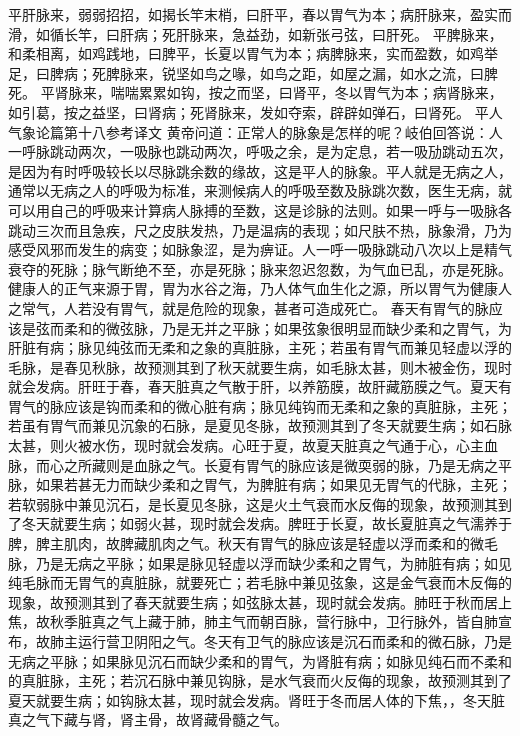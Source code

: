 \documentclass[a4paper,12pt,UTF8,twoside]{ctexbook}
\begin{document}
平肝脉来，弱弱招招，如揭长竿末梢，曰肝平，春以胃气为本；病肝脉来，盈实而滑，如循长竿，曰肝病；死肝脉来，急益劲，如新张弓弦，曰肝死。
平脾脉来，和柔相离，如鸡践地，曰脾平，长夏以胃气为本；病脾脉来，实而盈数，如鸡举足，曰脾病；死脾脉来，锐坚如鸟之喙，如鸟之距，如屋之漏，如水之流，曰脾死。
平肾脉来，喘喘累累如钩，按之而坚，曰肾平，冬以胃气为本；病肾脉来，如引葛，按之益坚，曰肾病；死肾脉来，发如夺索，辟辟如弹石，曰肾死。
平人气象论篇第十八参考译文
黄帝问道：正常人的脉象是怎样的呢？岐伯回答说：人一呼脉跳动两次，一吸脉也跳动两次，呼吸之余，是为定息，若一吸劢跳动五次，是因为有时呼吸较长以尽脉跳余数的缘故，这是平人的脉象。平人就是无病之人，通常以无病之人的呼吸为标准，来测候病人的呼吸至数及脉跳次数，医生无病，就可以用自己的呼吸来计算病人脉搏的至数，这是诊脉的法则。如果一呼与一吸脉各跳动三次而且急疾，尺之皮肤发热，乃是温病的表现；如尺肤不热，脉象滑，乃为感受风邪而发生的病变；如脉象涩，是为痹证。人一呼一吸脉跳动八次以上是精气衰夺的死脉；脉气断绝不至，亦是死脉；脉来忽迟忽数，为气血已乱，亦是死脉。
健康人的正气来源于胃，胃为水谷之海，乃人体气血生化之源，所以胃气为健康人之常气，人若没有胃气，就是危险的现象，甚者可造成死亡。
春天有胃气的脉应该是弦而柔和的微弦脉，乃是无并之平脉；如果弦象很明显而缺少柔和之胃气，为肝脏有病；脉见纯弦而无柔和之象的真脏脉，主死；若虽有胃气而兼见轻虚以浮的毛脉，是春见秋脉，故预测其到了秋天就要生病，如毛脉太甚，则木被金伤，现时就会发病。肝旺于春，春天脏真之气散于肝，以养筋膜，故肝藏筋膜之气。夏天有胃气的脉应该是钩而柔和的微心脏有病；脉见纯钩而无柔和之象的真脏脉，主死；若虽有胃气而兼见沉象的石脉，是夏见冬脉，故预测其到了冬天就要生病；如石脉太甚，则火被水伤，现时就会发病。心旺于夏，故夏天脏真之气通于心，心主血脉，而心之所藏则是血脉之气。长夏有胃气的脉应该是微耎弱的脉，乃是无病之平脉，如果若甚无力而缺少柔和之胃气，为脾脏有病；如果见无胃气的代脉，主死；若软弱脉中兼见沉石，是长夏见冬脉，这是火土气衰而水反侮的现象，故预测其到了冬天就要生病；如弱火甚，现时就会发病。脾旺于长夏，故长夏脏真之气濡养于脾，脾主肌肉，故脾藏肌肉之气。秋天有胃气的脉应该是轻虚以浮而柔和的微毛脉，乃是无病之平脉；如果是脉见轻虚以浮而缺少柔和之胃气，为肺脏有病；如见纯毛脉而无胃气的真脏脉，就要死亡；若毛脉中兼见弦象，这是金气衰而木反侮的现象，故预测其到了春天就要生病；如弦脉太甚，现时就会发病。肺旺于秋而居上焦，故秋季脏真之气上藏于肺，肺主气而朝百脉，营行脉中，卫行脉外，皆自肺宣布，故肺主运行营卫阴阳之气。冬天有卫气的脉应该是沉石而柔和的微石脉，乃是无病之平脉；如果脉见沉石而缺少柔和的胃气，为肾脏有病；如脉见纯石而不柔和的真脏脉，主死；若沉石脉中兼见钩脉，是水气衰而火反侮的现象，故预测其到了夏天就要生病；如钩脉太甚，现时就会发病。肾旺于冬而居人体的下焦，，冬天脏真之气下藏与肾，肾主骨，故肾藏骨髓之气。
\end{document}
